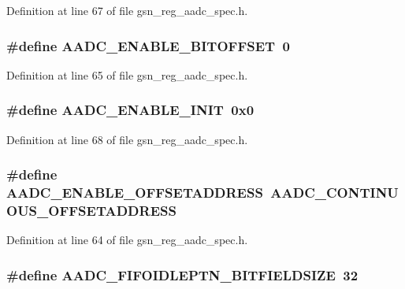 Definition at line 67 of file gsn\_\-reg\_\-aadc\_\-spec.h.

\hypertarget{a00543_a46eb5fba4e0e270568f60c0a10a35219}{
\subsubsection[{AADC\_\-ENABLE\_\-BITOFFSET}]{\setlength{\rightskip}{0pt plus 5cm}\#define AADC\_\-ENABLE\_\-BITOFFSET~0}}
\label{a00543_a46eb5fba4e0e270568f60c0a10a35219}


Definition at line 65 of file gsn\_\-reg\_\-aadc\_\-spec.h.

\hypertarget{a00543_a34b7cf1b93fa9a0eaf1e417b10cdb7af}{
\subsubsection[{AADC\_\-ENABLE\_\-INIT}]{\setlength{\rightskip}{0pt plus 5cm}\#define AADC\_\-ENABLE\_\-INIT~0x0}}
\label{a00543_a34b7cf1b93fa9a0eaf1e417b10cdb7af}


Definition at line 68 of file gsn\_\-reg\_\-aadc\_\-spec.h.

\hypertarget{a00543_a462e7a4aa146f1f782392cb7c760eab6}{
\subsubsection[{AADC\_\-ENABLE\_\-OFFSETADDRESS}]{\setlength{\rightskip}{0pt plus 5cm}\#define AADC\_\-ENABLE\_\-OFFSETADDRESS~AADC\_\-CONTINUOUS\_\-OFFSETADDRESS}}
\label{a00543_a462e7a4aa146f1f782392cb7c760eab6}


Definition at line 64 of file gsn\_\-reg\_\-aadc\_\-spec.h.

\hypertarget{a00543_a6a6580735ced9d7dfbd8850a6106f7af}{
\subsubsection[{AADC\_\-FIFOIDLEPTN\_\-BITFIELDSIZE}]{\setlength{\rightskip}{0pt plus 5cm}\#define AADC\_\-FIFOIDLEPTN\_\-BITFIELDSIZE~32}}
\label{a00543_a6a6580735ced9d7dfbd8850a6106f7af}


